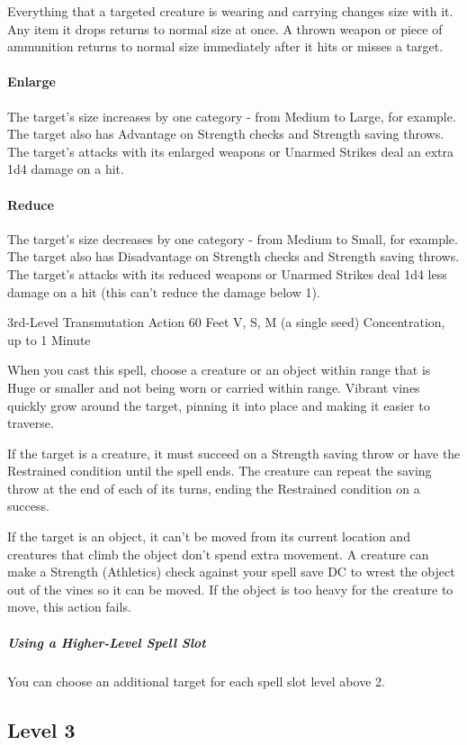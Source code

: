 \documentclass[letterpaper,openany,oneside,twocolumn]{book}
\begin{document}
Everything that a targeted creature is wearing and carrying changes size with it. Any item it drops returns to normal size at once. A thrown weapon or piece of ammunition returns to normal size immediately after it hits or misses a target.

\paragraph*{Enlarge} The target's size increases by one category - from Medium to Large, for example. The target also has Advantage on Strength checks and Strength saving throws. The target's attacks with its enlarged weapons or Unarmed Strikes deal an extra 1d4 damage on a hit.

\paragraph*{Reduce} The target's size decreases by one category - from Medium to Small, for example. The target also has Disadvantage on Strength checks and Strength saving throws. The target's attacks with its reduced weapons or Unarmed Strikes deal 1d4 less damage on a hit (this can't reduce the damage below 1).

	{3rd-Level Transmutation}
	{Action}
	{60 Feet}
	{V, S, M (a single seed)}
	{Concentration, up to 1 Minute}

When you cast this spell, choose a creature or an object within range that is Huge or smaller and not being worn or carried within range. Vibrant vines quickly grow around the target, pinning it into place and making it easier to traverse.

If the target is a creature, it must succeed on a Strength saving throw or have the Restrained condition until the spell ends. The creature can repeat the saving throw at the end of each of its turns, ending the Restrained condition on a success.

If the target is an object, it can't be moved from its current location and creatures that climb the object don't spend extra movement. A creature can make a Strength (Athletics) check against your spell save DC to wrest the object out of the vines so it can be moved. If the object is too heavy for the creature to move, this action fails.

\subparagraph*{Using a Higher-Level Spell Slot} You can choose an additional target for each spell slot level above 2.

\subsection*{Level 3}
\end{document}
